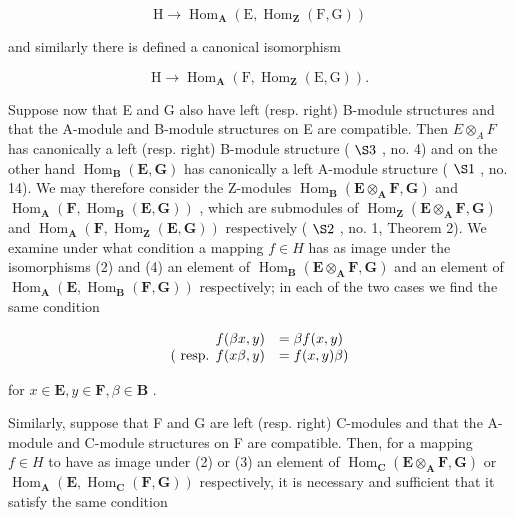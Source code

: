 \[
\mathrm{H} \rightarrow \operatorname{Hom} _ {\mathbf {A}} (\mathrm{E}, \operatorname{Hom} _ {\mathbf {Z}} (\mathrm{F}, \mathrm{G}))\tag{3}
\]

and similarly there is defined a canonical isomorphism

\[
\mathrm{H} \rightarrow \operatorname{Hom} _ {\mathbf {A}} (\mathrm{F}, \operatorname{Hom} _ {\mathbf {Z}} (\mathrm{E}, \mathrm{G})).\tag{4}
\]

Suppose now that E and G also have left (resp. right) B-module structures and that the A-module and B-module structures on E are compatible. Then \(E \otimes_{A} F\) has canonically a left (resp. right) B-module structure ( \(\S 3\) , no. 4) and on the other hand \(\operatorname{Hom}_{\mathbf{B}}(\mathbf{E}, \mathbf{G})\) has canonically a left A-module structure ( \(\S 1\) , no. 14). We may therefore consider the Z-modules \(\operatorname{Hom}_{\mathbf{B}}(\mathbf{E} \otimes_{\mathbf{A}} \mathbf{F}, \mathbf{G})\) and \(\operatorname{Hom}_{\mathbf{A}}(\mathbf{F}, \operatorname{Hom}_{\mathbf{B}}(\mathbf{E}, \mathbf{G}))\) , which are submodules of \(\operatorname{Hom}_{\mathbf{Z}}(\mathbf{E} \otimes_{\mathbf{A}} \mathbf{F}, \mathbf{G})\) and \(\operatorname{Hom}_{\mathbf{A}}(\mathbf{F}, \operatorname{Hom}_{\mathbf{Z}}(\mathbf{E}, \mathbf{G}))\) respectively ( \(\S 2\) , no. 1, Theorem 2). We examine under what condition a mapping \(f \in H\) has as image under the isomorphisms (2) and (4) an element of \(\operatorname{Hom}_{\mathbf{B}}(\mathbf{E} \otimes_{\mathbf{A}} \mathbf{F}, \mathbf{G})\) and an element of \(\operatorname{Hom}_{\mathbf{A}}(\mathbf{E}, \operatorname{Hom}_{\mathbf{B}}(\mathbf{F}, \mathbf{G}))\) respectively; in each of the two cases we find the same condition

\[
\begin{array}{r l} f (\beta x, y) & = \beta f (x, y) \\ (\text { resp.   } f (x \beta , y) & = f (x, y) \beta) \end{array}
\]

for \(x \in \mathbf{E}, y \in \mathbf{F}, \beta \in \mathbf{B}\) .

Similarly, suppose that F and G are left (resp. right) C-modules and that the A-module and C-module structures on F are compatible. Then, for a mapping \(f \in H\) to have as image under (2) or (3) an element of \(\operatorname{Hom}_{\mathbf{C}}(\mathbf{E} \otimes_{\mathbf{A}} \mathbf{F}, \mathbf{G})\) or \(\operatorname{Hom}_{\mathbf{A}}(\mathbf{E}, \operatorname{Hom}_{\mathbf{C}}(\mathbf{F}, \mathbf{G}))\) respectively, it is necessary and sufficient that it satisfy the same condition

